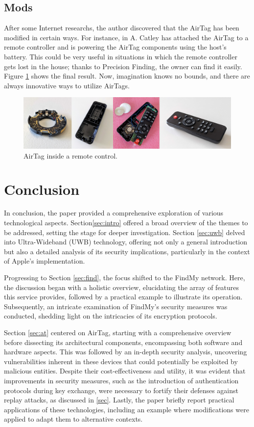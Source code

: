 \documentclass[english]{article}
\begin{document}
\subsection{Mods}
After some Internet researchs, the author discovered that the AirTag has been modified in certain ways. For instance, in \cite{telecomando} A. Catley has attached the AirTag to a remote controller and is powering the AirTag components using the host's battery. This could be very useful in situations in which the remote controller gets lost in the house; thanks to Precision Finding, the owner can find it easily. Figure \ref{img:controller} shows the final result.
Now, imagination knows no bounds, and there are always innovative ways to utilize AirTags.
\begin{figure}[]
	\centering
	\includegraphics[width=\textwidth]{images/remote.jpg}
	\caption{AirTag inside a remote control.}
	\label{img:controller}
\end{figure}

\section{Conclusion}
In conclusion, the paper provided a comprehensive exploration of various technological aspects. Section\ref{sec:intro} offered a broad overview of the themes to be addressed, setting the stage for deeper investigation. Section \ref{sec:uwb} delved into Ultra-Wideband (UWB) technology, offering not only a general introduction but also a detailed analysis of its security implications, particularly in the context of Apple's implementation.

Progressing to Section \ref{sec:find}, the focus shifted to the FindMy network. Here, the discussion began with a holistic overview, elucidating the array of features this service provides, followed by a practical example to illustrate its operation. Subsequently, an intricate examination of FindMy's security measures was conducted, shedding light on the intricacies of its encryption protocols.

Section \ref{sec:at} centered on AirTag, starting with a comprehensive overview before dissecting its architectural components, encompassing both software and hardware aspects. This was followed by an in-depth security analysis, uncovering vulnerabilities inherent in these devices that could potentially be exploited by malicious entities. Despite their cost-effectiveness and utility, it was evident that improvements in security measures, such as the introduction of authentication protocols during key exchange, were necessary to fortify their defenses against replay attacks, as discussed in \ref{sec}.
Lastly, the paper briefly report practical applications of these technologies, including an example where modifications were applied to adapt them to alternative contexts. 

\printbibliography
\nocite{*}
\end{document}
